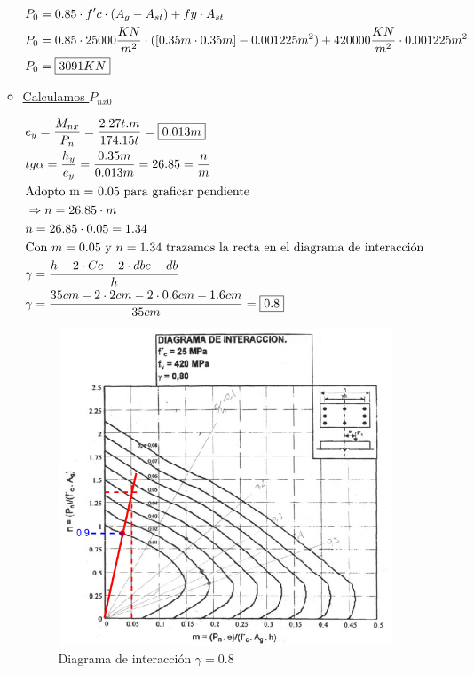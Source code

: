 \begin{enumerate}
\begin{itemize}
\begin{align*}
& P_0 = 0.85 \cdot f'c \cdot (A_g - A_{st}) + fy \cdot A_{st}\\
& P_0 = 0.85 \cdot 25000 \frac{KN}{m^2} \cdot ([0.35m \cdot 0.35m] - 0.001225m^2) + 420000 \frac{KN}{m^2} \cdot 0.001225m^2\\
& P_0 = \framebox{$3091 KN$}
\end{align*}

\item \underline{Calculamos $P_{nx0}$}

\begin{align*}
& e_y = \frac{M_{nx}}{P_n} = \frac{2.27 t.m}{174.15 t} = \framebox{$0.013 m$}\\
& tg \alpha = \frac{h_y}{e_y} = \frac{0.35m}{0.013m} = 26.85 = \frac{n}{m}\\
& \text{Adopto m = 0.05 para graficar pendiente}\\
& \Rightarrow n = 26.85 \cdot m \\
& n = 26.85 \cdot 0.05 = 1.34\\
& \text{Con } m = 0.05 \text{ y } n = 1.34 \text{ trazamos la recta en el diagrama de interacción}\\
& \gamma = \frac{h - 2 \cdot Cc - 2 \cdot dbe - db}{h}\\
& \gamma = \frac{35cm - 2 \cdot 2cm - 2 \cdot 0.6cm - 1.6cm}{35cm} = \framebox{0.8}
\end{align*}

\begin{figure}[H]
\begin{center}
	 \includegraphics[scale = 0.9]{chapters/chapter_1/images/figura4.png}
     \caption{Diagrama de interacción $\gamma = 0.8$}
     \label{diagrama_interaccion_1}
\end{center}
\end{figure}


\end{itemize}
\end{enumerate}
